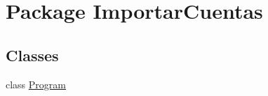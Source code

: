 \hypertarget{namespace_importar_cuentas}{\section{Package Importar\-Cuentas}
\label{namespace_importar_cuentas}
}
\subsection*{Classes}
\begin{DoxyCompactItemize}
\item 
class \hyperlink{class_importar_cuentas_1_1_program}{Program}
\end{DoxyCompactItemize}
